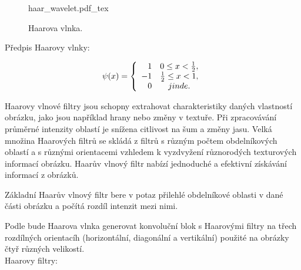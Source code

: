 \documentclass[czech,BP]{thesiskiv}
\begin{document}
\begin{figure}[H]
    \centering
    \def\svgwidth{200px}
    {haar_wavelet.pdf_tex} 
    \caption{Haarova vlnka.}
\end{figure} 

Předpis Haarovy vlnky:

\begin{displaymath} 
	\label{haar} 
		    \psi(x) = \left\{ \begin{array}{r@{\quad}c}
    		1 & 0 \leq x < \frac{1}{2}, \\
    		-1 & \frac{1}{2} \leq x < 1, \\ 
    		0 & jinde. \\  \end{array} \right. 
\end{displaymath} 
\vspace{1cm}


\par Haarovy vlnové filtry jsou schopny extrahovat charakteristiky daných vlastností obrázku, jako jsou například hrany nebo změny v textuře.  Při zpracovávání průměrné intenzity oblastí je snížena citlivost na šum a změny jasu. Velká množina Haarových filtrů se skládá z filtrů s různým počtem obdelníkových oblastí a s různými orientacemi vzhledem k vyzdvyžení různorodých texturových informací obrázku. Haarův vlnový filtr nabízí jednoduché a efektivní získávání informací z obrázků.
\par Základní Haarův vlnový filtr bere v potaz přilehlé obdelníkové oblasti v dané části obrázku a počítá rozdíl intenzit mezi nimi. 
 
\par Podle \citep{JEC} bude Haarova vlnka generovat konvoluční blok s Haarovými filtry na třech rozdílných orientacíh (horizontální, diagonální a vertikální) použité na obrázky čtyř různých velikostí.  \\

\vspace{0.5cm}
\noindent Haarovy filtry: 
\end{document}
